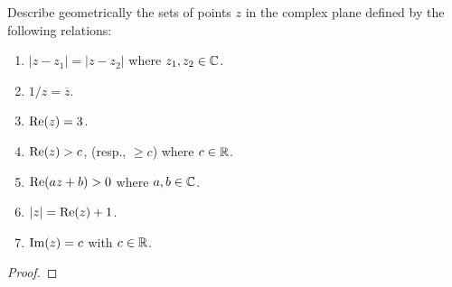 \documentclass[../hw1]{subfiles}
\begin{document}
\begin{problem}
Describe geometrically the sets of points $z$ in the complex plane defined by the
following relations:
\begin{enumerate}[label=(\alph*)]
	\item $|z-z_1| = |z-z_2|$ where $z_1,z_2\in \mathbb{C}$.
	\item $1 / z = \overline{z}$.
	\item $\operatorname{Re}(z)=3$.
	\item $\operatorname{Re}(z)>c$, (resp., $\ge c$) where $c\in \mathbb{R}$.
	\item $\operatorname{Re}(az+b)>0$ where $a,b \in \mathbb{C}$.
	\item $|z| =\operatorname{Re}(z)+1$.
	\item $\operatorname{Im}(z)=c$ with $c \in \mathbb{R}$.
\end{enumerate}
\end{problem}
\begin{proof}

\end{proof}
\end{document}
